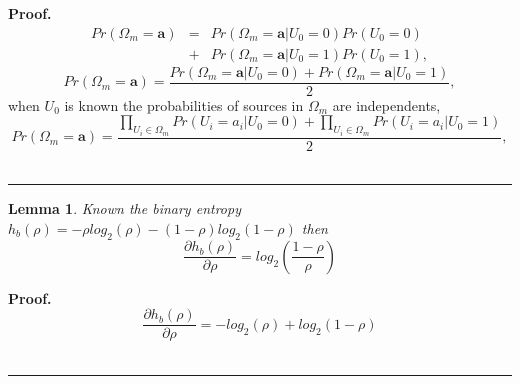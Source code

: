 \documentclass[a4paper,10pt]{article}
\newtheorem{mylemma}[mytheorem]{Lemma}
\newenvironment{myproof}[1][Proof]{\textbf{#1.} }{\ \rule{0.5em}{0.5em}}
\begin{document}
\begin{myproof}
 \label{proof:PrA} 
\begin{equation}\label{eq:PA1}
\begin{matrix}
Pr(\Omega_m=\mathbf{a})&=&Pr(\Omega_m=\mathbf{a}|U_0=0)Pr(U_0=0)\\
~                 &+&Pr(\Omega_m=\mathbf{a}|U_0=1)Pr(U_0=1), 
\end{matrix}
\end{equation}
\begin{equation}\label{eq:PA2}
Pr(\Omega_m=\mathbf{a})=\frac{Pr(\Omega_m=\mathbf{a}|U_0=0)+Pr(\Omega_m=\mathbf{a}|U_0=1)}{2},
\end{equation}
when $U_0$ is known the probabilities of sources in $\Omega_m$ are independents,
\begin{equation}\label{eq:PA3}
Pr(\Omega_m=\mathbf{a})=\frac{\prod \limits_{U_i\in \Omega_m}{Pr(U_i=a_i|U_0=0)}+\prod \limits_{U_i\in \Omega_m}{Pr(U_i=a_i|U_0=1)}}{2},
\end{equation}
\end{myproof}
\begin{mdframed}[style=MDFStyGrayScreen]
\begin{mylemma}
 \label{lemm:dhdrho}
Known the binary entropy $h_{b}(\rho)=-\rho log_2(\rho)-(1-\rho) log_2(1-\rho)$ then
\begin{equation}\label{eq:dhdrho1}
 \frac{\partial h_{b}(\rho)}{\partial \rho}= log_2 \left( \frac{1-\rho}{\rho} \right )
\end{equation}
\end{mylemma}
\end{mdframed}

\begin{myproof}
 \label{proof:dhdrho} 
\begin{equation}\label{eq:dhdrho2}
 \frac{\partial h_{b}(\rho)}{\partial \rho}= - log_2(\rho)+ log_2(1-\rho)
\end{equation}
\end{myproof}
\end{document}
